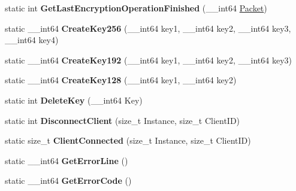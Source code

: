 \begin{DoxyCompactItemize}
\item 
\hypertarget{structmn_c_l_r_aff11ce1cdf38f0f595057c2f718b99b1}{
static int {\bfseries GetLastEncryptionOperationFinished} (\_\-\_\-int64 \hyperlink{class_packet}{Packet})}
\label{structmn_c_l_r_aff11ce1cdf38f0f595057c2f718b99b1}

\item 
\hypertarget{structmn_c_l_r_aeafc69f8b921f4f5846c15916e2a7c85}{
static \_\-\_\-int64 {\bfseries CreateKey256} (\_\-\_\-int64 key1, \_\-\_\-int64 key2, \_\-\_\-int64 key3, \_\-\_\-int64 key4)}
\label{structmn_c_l_r_aeafc69f8b921f4f5846c15916e2a7c85}

\item 
\hypertarget{structmn_c_l_r_a86357ee7f2b4b260e36da74cbe244d9b}{
static \_\-\_\-int64 {\bfseries CreateKey192} (\_\-\_\-int64 key1, \_\-\_\-int64 key2, \_\-\_\-int64 key3)}
\label{structmn_c_l_r_a86357ee7f2b4b260e36da74cbe244d9b}

\item 
\hypertarget{structmn_c_l_r_a80a433a53f30f02958b3bb8608b0a446}{
static \_\-\_\-int64 {\bfseries CreateKey128} (\_\-\_\-int64 key1, \_\-\_\-int64 key2)}
\label{structmn_c_l_r_a80a433a53f30f02958b3bb8608b0a446}

\item 
\hypertarget{structmn_c_l_r_ac377a27b99f96d89e6b4459fa6f61758}{
static int {\bfseries DeleteKey} (\_\-\_\-int64 Key)}
\label{structmn_c_l_r_ac377a27b99f96d89e6b4459fa6f61758}

\item 
\hypertarget{structmn_c_l_r_a11da30f4e6f0d3934cf112a1e16113be}{
static int {\bfseries DisconnectClient} (size\_\-t Instance, size\_\-t ClientID)}
\label{structmn_c_l_r_a11da30f4e6f0d3934cf112a1e16113be}

\item 
\hypertarget{structmn_c_l_r_af16fd3ffd7c6598e4e89c7978b4d3efa}{
static size\_\-t {\bfseries ClientConnected} (size\_\-t Instance, size\_\-t ClientID)}
\label{structmn_c_l_r_af16fd3ffd7c6598e4e89c7978b4d3efa}

\item 
\hypertarget{structmn_c_l_r_a2799a69a3d2b9a64118b26b4f8f7db6d}{
static \_\-\_\-int64 {\bfseries GetErrorLine} ()}
\label{structmn_c_l_r_a2799a69a3d2b9a64118b26b4f8f7db6d}

\item 
\hypertarget{structmn_c_l_r_a84323818347585e7e188a36e6130ecdc}{
static \_\-\_\-int64 {\bfseries GetErrorCode} ()}
\label{structmn_c_l_r_a84323818347585e7e188a36e6130ecdc}


\end{DoxyCompactItemize}
